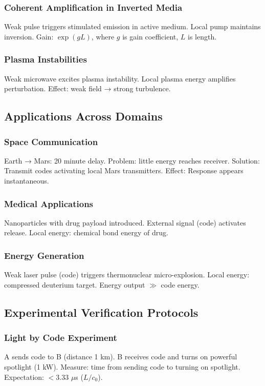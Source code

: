 \documentclass[11pt,a4paper]{article}
\begin{document}
	\subsubsection{Coherent Amplification in Inverted Media}
	Weak pulse triggers stimulated emission in active medium. Local pump maintains inversion. Gain: $\exp(gL)$, where $g$ is gain coefficient, $L$ is length.
	
	\subsubsection{Plasma Instabilities}
	Weak microwave excites plasma instability. Local plasma energy amplifies perturbation. Effect: weak field → strong turbulence.
	
	\subsection{Applications Across Domains}
	
	\subsubsection{Space Communication}
	Earth → Mars: 20 minute delay. Problem: little energy reaches receiver. Solution: Transmit codes activating local Mars transmitters. Effect: Response appears instantaneous.
	
	\subsubsection{Medical Applications}
	Nanoparticles with drug payload introduced. External signal (code) activates release. Local energy: chemical bond energy of drug.
	
	\subsubsection{Energy Generation}
	Weak laser pulse (code) triggers thermonuclear micro-explosion. Local energy: compressed deuterium target. Energy output $\gg$ code energy.
	
	\subsection{Experimental Verification Protocols}
	
	\subsubsection{Light by Code Experiment}
	A sends code to B (distance 1 km). B receives code and turns on powerful spotlight (1 kW). Measure: time from sending code to turning on spotlight. Expectation: $< 3.33$ $\mu$s ($L/c_0$).
	
\end{document}
